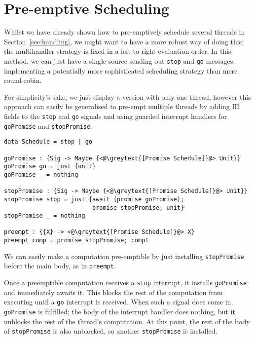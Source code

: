 \documentclass[msc,deptreport,cs]{infthesis} %
\newcommand{\code}[1]{\lstinline{#1}}
\newcommand{\greytext}[1]{\textcolor{black!40}{#1}}
\begin{document}
\section{Pre-emptive Scheduling}
\label{sec:pre-emptive-scheduling}

Whilst we have already shown how to pre-emptively schedule several threads in
Section~\ref{sec:handling}, we might want to have a more robust way of doing
this; the multihandler strategy is fixed in a left-to-right evaluation order. In
this method, we can just have a single source sending out \code{stop} and
\code{go} messages, implementing a potentially more sophisticated scheduling
strategy than mere round-robin.

For simplicity's sake, we just display a version with only one thread, however
this approach can easily be generalised to pre-empt multiple threads by adding
ID fields to the \code{stop} and \code{go} signals and using guarded interrupt
handlers for \code{goPromise} and \code{stopPromise}.

\begin{lstlisting}
data Schedule = stop | go

goPromise : {Sig -> Maybe {<@\greytext{[Promise Schedule]}@> Unit}}
goPromise go = just {unit}
goPromise _ = nothing

stopPromise : {Sig -> Maybe {<@\greytext{[Promise Schedule]}@> Unit}}
stopPromise stop = just {await (promise goPromise);
                         promise stopPromise; unit}
stopPromise _ = nothing

preempt : {{X} -> <@\greytext{[Promise Schedule]}@> X}
preempt comp = promise stopPromise; comp!
\end{lstlisting}

\noindent We can easily make a computation pre-emptible by just installing
\code{stopPromise} before the main body, as in \code{preempt}.

Once a preemptible computation receives a \code{stop} interrupt, it installs
\code{goPromise} and immediately awaits it. This blocks the rest of the
computation from executing until a \code{go} interrupt is received. When such a
signal does come in, \code{goPromise} is fulfilled; the body of the interrupt
handler does nothing, but it unblocks the rest of the thread's computation. At
this point, the rest of the body of \code{stopPromise} is also unblocked, so
another \code{stopPromise} is installed.


\end{document}
